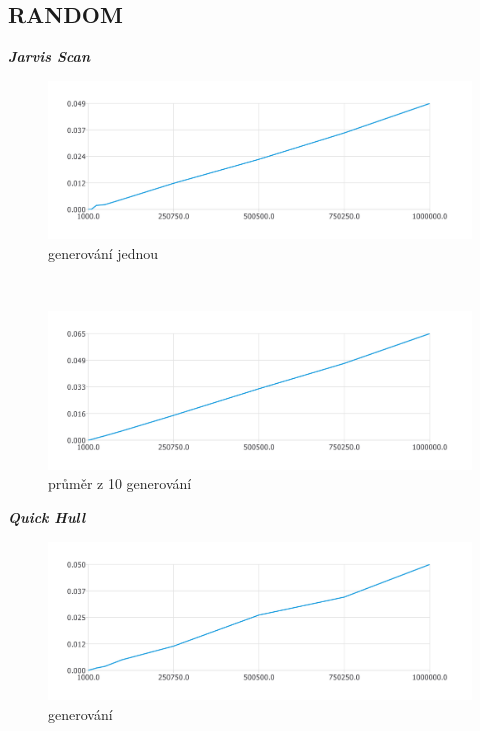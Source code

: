 \documentclass{article}
\begin{document}
\subsection{RANDOM}
\textit{\textbf {Jarvis Scan}}
\\
\begin{figure}[htbp]
\centering
        \includegraphics[clip, trim=0cm 0cm 0cm 0cm, width=1\textwidth]{pdf1.pdf}
        \caption{generování jednou}
\end{figure}
\\
\begin{figure}[htbp]
\centering
        \includegraphics[clip, trim=0cm 0cm 0cm 0cm, width=1\textwidth]{ranj.pdf}
        \caption{průměr z 10 generování}
\end{figure}
\clearpage
\newpage
\textit{\textbf {Quick Hull}}
\\
\begin{figure}[htbp]
\centering
        \includegraphics[clip, trim=0cm 0cm 0cm 0cm, width=1\textwidth]{pdf4.pdf}
        \caption{generování}
\end{figure}
\end{document}
